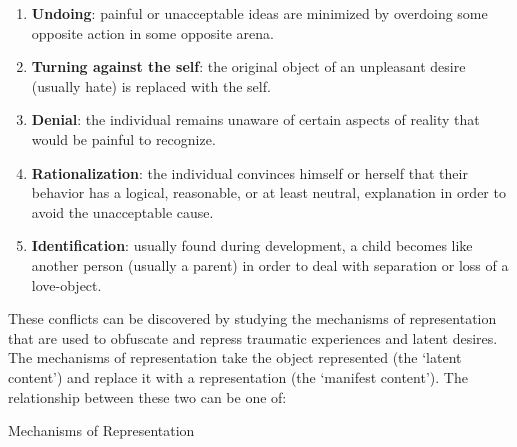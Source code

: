 \begin{refsection}
\begin{enumerate}
\item \textbf{Undoing}: painful or unacceptable ideas are minimized by overdoing some opposite action in some opposite arena.

\item \textbf{Turning against the self}: the original object of an unpleasant desire (usually hate) is replaced with the self.

\item \textbf{Denial}: the individual remains unaware of certain aspects of reality that would be painful to recognize.

\item \textbf{Rationalization}: the individual convinces himself or herself that their behavior has a logical, reasonable, or at least neutral, explanation in order to avoid the unacceptable cause.

\item \textbf{Identification}: usually found during development, a child becomes like another person (usually a parent) in order to deal with separation or loss of a love-object.

\end{enumerate}

These conflicts can be discovered by studying the mechanisms of representation that are used to obfuscate and repress traumatic experiences and latent desires. The mechanisms of representation take the object represented (the `latent content') and replace it with a representation (the `manifest content'). The relationship between these two can be one of:

\begin{apatextbox}{Mechanisms of Representation}

 \\

 \\

 \\


\end{apatextbox}
\end{refsection}
